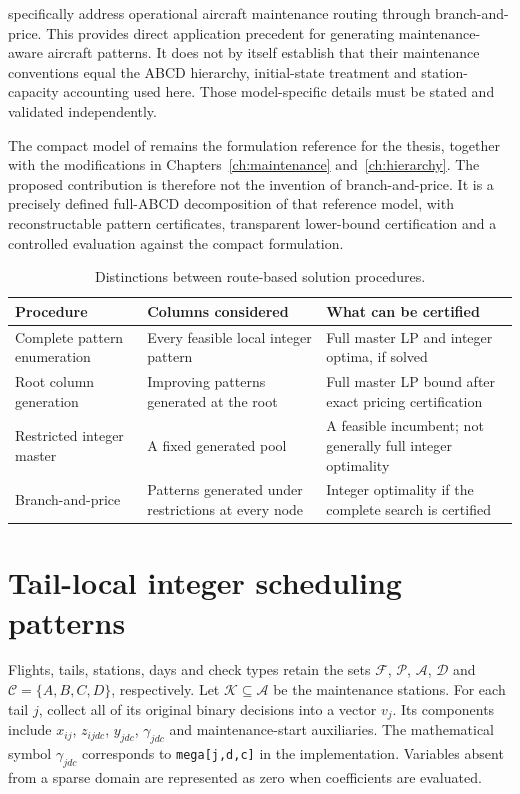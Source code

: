 \citet{sarac2006branch} specifically address operational aircraft maintenance
routing through branch-and-price. This provides direct application precedent
for generating maintenance-aware aircraft patterns. It does not by itself
establish that their maintenance conventions equal the ABCD hierarchy,
initial-state treatment and station-capacity accounting used here. Those
model-specific details must be stated and validated independently.

The compact model of \citet{khaled2018compact} remains the formulation reference
for the thesis, together with the modifications in
Chapters~\ref{ch:maintenance} and~\ref{ch:hierarchy}. The proposed contribution
is therefore not the invention of branch-and-price. It is a precisely defined
full-ABCD decomposition of that reference model, with reconstructable pattern
certificates, transparent lower-bound certification and a controlled evaluation
against the compact formulation.

\begin{table}[htbp]
\centering\small
\caption{Distinctions between route-based solution procedures.}
\label{tab:bp_method_distinctions}
\begin{tabularx}{\textwidth}{@{}p{}XX@{}}
\toprule
Procedure & Columns considered & What can be certified \\
\midrule
Complete pattern enumeration & Every feasible local integer pattern & Full master LP and integer optima, if solved \\
Root column generation & Improving patterns generated at the root & Full master LP bound after exact pricing certification \\
Restricted integer master & A fixed generated pool & A feasible incumbent; not generally full integer optimality \\
Branch-and-price & Patterns generated under restrictions at every node & Integer optimality if the complete search is certified \\
\bottomrule
\end{tabularx}
\end{table}

\section{Tail-local integer scheduling patterns}
\label{sec:bp_local_sets}

Flights, tails, stations, days and check types retain the sets
$\mathcal F$, $\mathcal P$, $\mathcal A$, $\mathcal D$ and
$\mathcal C=\{A,B,C,D\}$, respectively. Let $\mathcal K\subseteq\mathcal A$
be the maintenance stations. For each tail $j$, collect all of its original
binary decisions into a vector $v_j$. Its components include $x_{ij}$,
$z_{ijdc}$, $y_{jdc}$, $\gamma_{jdc}$ and maintenance-start auxiliaries.
The mathematical symbol $\gamma_{jdc}$ corresponds to \texttt{mega[j,d,c]}
in the implementation. Variables absent from a sparse domain are represented
as zero when coefficients are evaluated.

